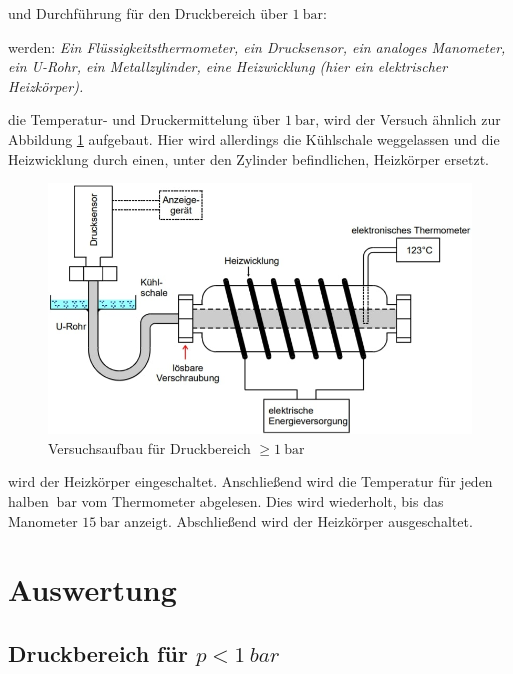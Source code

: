 \justifying und Durchführung für den Druckbereich über $\SI{1}{\bar}$:

\justifying werden: \textit{Ein Flüssigkeitsthermometer, ein Drucksensor, ein analoges Manometer, ein U-Rohr, ein Metallzylinder, eine Heizwicklung 
(hier ein elektrischer Heizkörper).}

\justifying die Temperatur- und Druckermittelung über $\SI{1}{\bar}$, wird der Versuch ähnlich zur Abbildung \ref{fig:3} aufgebaut. 
Hier wird allerdings die Kühlschale weggelassen und die Heizwicklung durch einen, unter den Zylinder befindlichen, Heizkörper ersetzt. 

\begin{figure}[H]
    \centering
    \includegraphics[width=\linewidth]{./images/g1bar.jpg}
    \caption{Versuchsaufbau für Druckbereich $\geq \SI{1}{\bar}$ \cite{V203}}
    \label{fig:3}
\end{figure}

\justifying wird der Heizkörper eingeschaltet. Anschließend wird die Temperatur für jeden halben $\SI{}{\bar}$ vom Thermometer
abgelesen. Dies wird wiederholt, bis das Manometer $\SI{15}{\bar}$ anzeigt. Abschließend wird der Heizkörper ausgeschaltet.


\section{Auswertung}

\subsection{Druckbereich für $p < \SI{1}{bar}$}

